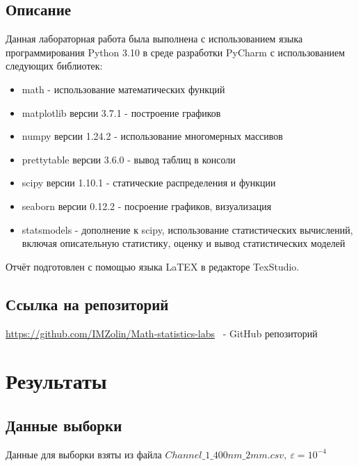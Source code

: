 \documentclass[a4paper,14pt]{article}
\begin{document}
	\subsection{Описание}
	Данная лабораторная работа была выполнена с использованием языка
	программирования Python 3.10 в среде разработки PyCharm с
	использованием следующих библиотек:
	\begin{itemize}
		\item math - использование математических функций
		\item matplotlib версии 3.7.1 - построение графиков
		\item numpy версии 1.24.2 - использование многомерных массивов
		\item prettytable версии 3.6.0 - вывод таблиц в консоли 
		\item scipy версии 1.10.1 - статические распределения и функции
		\item seaborn версии 0.12.2 - посроение графиков, визуализация
		\item statsmodels - дополнение к scipy, использование статистических вычислений, включая описательную статистику, оценку и вывод статистических моделей
	\end{itemize}
	Отчёт подготовлен с помощью языка LaTEX в редакторе TexStudio.
		\subsection{Ссылка на репозиторий}
		\url{https://github.com/IMZolin/Math-statistics-labs} \ - GitHub репозиторий
	
	\section{Результаты}
	\subsection{Данные выборки}
	Данные для выборки взяты из файла $Channel\_ 1\_400nm\_2mm.csv, \ \varepsilon = 10^{-4}$
	
\end{document}

